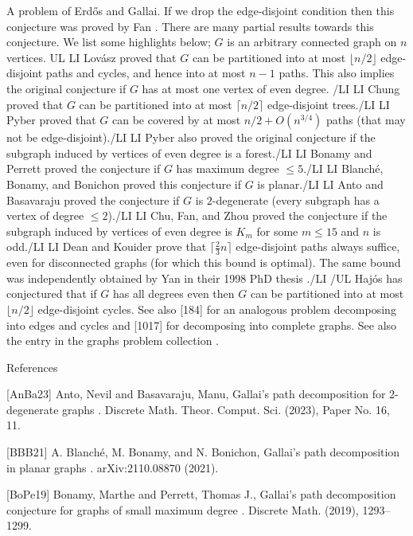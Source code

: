 \documentclass{article}
\begin{document}
A problem of Erd\H{o}s and Gallai. If we drop the edge-disjoint condition then this conjecture was proved by Fan \cite{Fa02}. There are many partial results towards this conjecture. We list some highlights below; $G$ is an arbitrary connected graph on $n$ vertices. {UL} {LI} Lov\'{a}sz \cite{Lo68} proved that $G$ can be partitioned into at most $\lfloor n/2\rfloor$ edge-disjoint paths and cycles, and hence into at most $n-1$ paths. This also implies the original conjecture if $G$ has at most one vertex of even degree. {/LI} {LI} Chung \cite{Ch78} proved that $G$ can be partitioned into at most $\lceil n/2\rceil$ edge-disjoint trees.{/LI} {LI} Pyber \cite{Py96} proved that $G$ can be covered by at most $n/2+O(n^{3/4})$ paths (that may not be edge-disjoint).{/LI} {LI} Pyber \cite{Py96} also proved the original conjecture if the subgraph induced by vertices of even degree is a forest.{/LI} {LI} Bonamy and Perrett \cite{BoPe19} proved the conjecture if $G$ has maximum degree $\leq 5$.{/LI} {LI} Blanch\'{e}, Bonamy, and Bonichon \cite{BBB21} proved this conjecture if $G$ is planar.{/LI} {LI} Anto and Basavaraju \cite{AnBa23} proved the conjecture if $G$ is $2$-degenerate (every subgraph has a vertex of degree $\leq 2$).{/LI} {LI} Chu, Fan, and Zhou \cite{CFZ26} proved the conjecture if the subgraph induced by vertices of even degree is $K_m$ for some $m\leq 15$ and $n$ is odd.{/LI} {LI} Dean and Kouider \cite{DeKo00} prove that $\lceil \frac{2}{3}n\rceil$ edge-disjoint paths always suffice, even for disconnected graphs (for which this bound is optimal). The same bound was independently obtained by Yan in their 1998 PhD thesis .{/LI} {/UL} Haj\'{o}s \cite{Lo68} has conjectured that if $G$ has all degrees even then $G$ can be partitioned into at most $\lfloor n/2\rfloor$ edge-disjoint cycles. See also [184] for an analogous problem decomposing into edges and cycles and [1017] for decomposing into complete graphs. See also the entry in the graphs problem collection .




References

[AnBa23] Anto, Nevil and Basavaraju, Manu, Gallai's path decomposition for 2-degenerate graphs . Discrete Math. Theor. Comput. Sci. (2023), Paper No. 16, 11.

[BBB21] A. Blanch\'{e}, M. Bonamy, and N. Bonichon, Gallai's path decomposition in planar graphs . arXiv:2110.08870 (2021).

[BoPe19] Bonamy, Marthe and Perrett, Thomas J., Gallai's path decomposition conjecture for graphs of small maximum degree . Discrete Math. (2019), 1293--1299.
\end{document}
